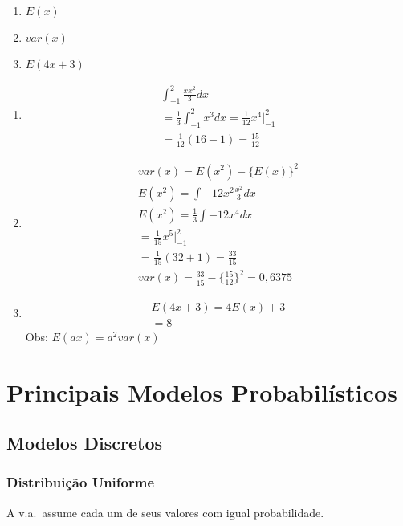 \documentclass[11pt,a4paper]{article}
\begin{document}
\begin{enumerate}[label=(\alph*)]
  \item $E(x)$
  \item $var(x)$
  \item $E(4x+3)$
\end{enumerate}
\begin{enumerate}[label=(\alph*)]
  \item 
    \begin{align}
      \int_{-1}^{2}\frac{x x^2}{3}dx\\
      =\frac{1}{3}\int_{-1}^{2}x^3dx=\frac{1}{12} x^4 |_{-1}^{2}\\
      =\frac{1}{12}(16-1)=\frac{15}{12}
    \end{align}
  \item 
    \begin{align}
      var(x)=E(x^2)-\{E(x)\}^2\\
      E(x^2)=\int{-1}{2} x^2 \frac{x^2}{3}dx\\
      E(x^2)=\frac{1}{3}\int{-1}{2} x^4 dx\\
      =\frac{1}{15}x^5 |_{-1}^2\\
      =\frac{1}{15}(32+1)=\frac{33}{15}\\
      var(x)=\frac{33}{15}-\{\frac{15}{12}\}^2=0,6375
    \end{align}
  \item 
    \begin{align}
      E(4x+3)=4E(x)+3\\
      =8
    \end{align}
    Obs: $E(ax)= a^2 var(x)$
\end{enumerate}
\section{Principais Modelos Probabilísticos}
\subsection{Modelos Discretos}
\subsubsection{Distribuição Uniforme}
A v.a.\ assume cada um de seus valores com igual probabilidade.
\end{document}
